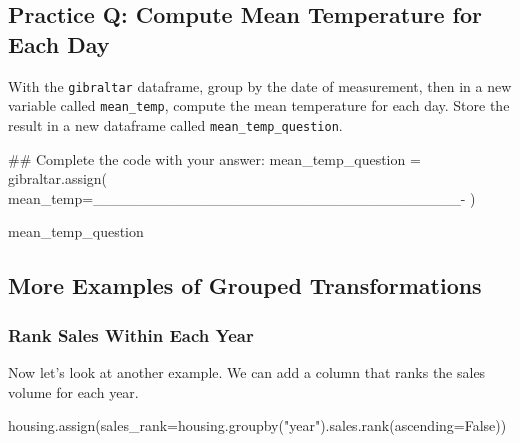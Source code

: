 \documentclass[
  letterpaper,
  DIV=11,
  numbers=noendperiod]{scrreprt}
\newenvironment{Shaded}{\begin{snugshade}}{\end{snugshade}}
\newcommand{\CommentTok}[1]{\textcolor[rgb]{0.37,0.37,0.37}{#1}}
\newcommand{\NormalTok}[1]{\textcolor[rgb]{0.00,0.23,0.31}{#1}}
\newcommand{\OperatorTok}[1]{\textcolor[rgb]{0.37,0.37,0.37}{#1}}
\newcommand{\StringTok}[1]{\textcolor[rgb]{0.13,0.47,0.30}{#1}}
\newcommand{\VariableTok}[1]{\textcolor[rgb]{0.07,0.07,0.07}{#1}}
\begin{document}
\begin{tcolorbox}[enhanced jigsaw, colframe=quarto-callout-tip-color-frame, opacityback=0, titlerule=0mm, bottomrule=.15mm, breakable, leftrule=.75mm, colbacktitle=quarto-callout-tip-color!10!white, title=\textcolor{quarto-callout-tip-color}{\faLightbulb}\hspace{0.5em}{Practice}, rightrule=.15mm, coltitle=black, opacitybacktitle=0.6, colback=white, left=2mm, arc=.35mm, toptitle=1mm, bottomtitle=1mm, toprule=.15mm]

\subsection{Practice Q: Compute Mean Temperature for Each
Day}\label{practice-q-compute-mean-temperature-for-each-day}

With the \texttt{gibraltar} dataframe, group by the date of measurement,
then in a new variable called \texttt{mean\_temp}, compute the mean
temperature for each day. Store the result in a new dataframe called
\texttt{mean\_temp\_question}.

\begin{Shaded}
\begin{Highlighting}[]
\CommentTok{\#\# Complete the code with your answer:}
\NormalTok{mean\_temp\_question }\OperatorTok{=}\NormalTok{ gibraltar.assign(}
\NormalTok{    mean\_temp}\OperatorTok{=}\NormalTok{\_\_\_\_\_\_\_\_\_\_\_\_\_\_\_\_\_\_\_\_\_\_\_\_\_\_\_\_\_\_\_\_\_\_\_}\OperatorTok{{-}}
\NormalTok{)}

\NormalTok{mean\_temp\_question}
\end{Highlighting}
\end{Shaded}

\end{tcolorbox}

\subsection{More Examples of Grouped
Transformations}\label{more-examples-of-grouped-transformations}

\subsubsection{Rank Sales Within Each
Year}\label{rank-sales-within-each-year}

Now let's look at another example. We can add a column that ranks the
sales volume for each year.

\begin{Shaded}
\begin{Highlighting}[]
\NormalTok{housing.assign(sales\_rank}\OperatorTok{=}\NormalTok{housing.groupby(}\StringTok{"year"}\NormalTok{).sales.rank(ascending}\OperatorTok{=}\VariableTok{False}\NormalTok{))}
\end{Highlighting}
\end{Shaded}
\end{document}
